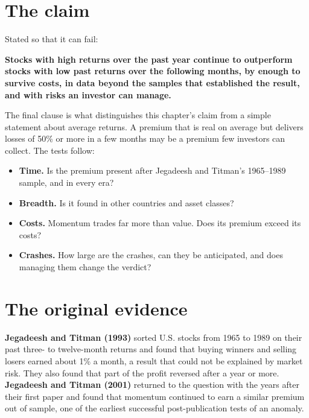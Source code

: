 \section{The claim}
\label{sec:05-claim}

Stated so that it can fail:

\begin{callout}
\textbf{Stocks with high returns over the past year continue to outperform stocks with low past returns over the following months, by enough to survive costs, in data beyond the samples that established the result, and with risks an investor can manage.}
\end{callout}

The final clause is what distinguishes this chapter's claim from a simple statement about average returns. A premium that is real on average but delivers losses of 50\% or more in a few months may be a premium few investors can collect. The tests follow:

\begin{itemize}
  \item \textbf{Time.} Is the premium present after Jegadeesh and Titman's 1965--1989 sample, and in every era?
  \item \textbf{Breadth.} Is it found in other countries and asset classes?
  \item \textbf{Costs.} Momentum trades far more than value. Does its premium exceed its costs?
  \item \textbf{Crashes.} How large are the crashes, can they be anticipated, and does managing them change the verdict?
\end{itemize}

\section{The original evidence}
\label{sec:05-evidence}

\textbf{Jegadeesh and Titman (1993)} sorted U.S. stocks from 1965 to 1989 on their past three- to twelve-month returns and found that buying winners and selling losers earned about 1\% a month, a result that could not be explained by market risk. They also found that part of the profit reversed after a year or more. \textbf{Jegadeesh and Titman (2001)} returned to the question with the years after their first paper and found that momentum continued to earn a similar premium out of sample, one of the earliest successful post-publication tests of an anomaly.

